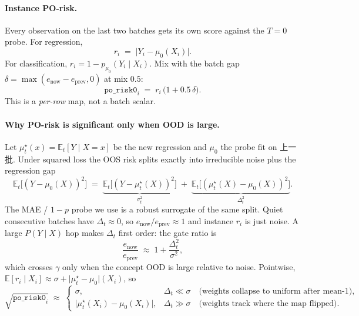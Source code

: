 \paragraph{Instance PO-risk.}
Every observation on the last two batches gets its own score against
the $T=0$ probe. For regression,
\begin{equation}
  r_i \;=\; \bigl|Y_i - \mu_0(X_i)\bigr|.
\end{equation}
For classification, $r_i=1-p_{\mu_0}(Y_i\mid X_i)$. Mix with the batch
gap $\delta=\max(e_{\mathrm{now}}-e_{\mathrm{prev}},0)$ at mix $0.5$:
\begin{equation}
  \texttt{po\_risk0}_i
    \;=\; r_i\,\bigl(1 + 0.5\,\delta\bigr).
\end{equation}
This is a \emph{per-row} map, not a batch scalar.

\paragraph{Why PO-risk is significant only when OOD is large.}
Let $\mu_t^\star(x)=\mathbb{E}_t[Y\mid X=x]$ be the new regression and
$\mu_0$ the probe fit on 上一批. Under squared loss the OOS risk
splits exactly into irreducible noise plus the regression gap
\begin{equation}
  \mathbb{E}_t\bigl[(Y-\mu_0(X))^2\bigr]
    \;=\;
    \underbrace{\mathbb{E}_t\bigl[(Y-\mu_t^\star(X))^2\bigr]}_{\sigma_t^2}
    \;+\;
    \underbrace{\mathbb{E}_t\bigl[(\mu_t^\star(X)-\mu_0(X))^2\bigr]}_{\Delta_t^2}.
  \label{eq:po-excess}
\end{equation}
The MAE / $1-p$ probe we use is a robust surrogate of the same split.
Quiet consecutive batches have $\Delta_t\approx 0$, so
$e_{\mathrm{now}}/e_{\mathrm{prev}}\approx 1$ and instance
$r_i$ is just noise. A large $P(Y\mid X)$ hop makes $\Delta_t$ first
order: the gate ratio is
\begin{equation}
  \frac{e_{\mathrm{now}}}{e_{\mathrm{prev}}}
    \;\approx\;
    1 + \frac{\Delta_t^2}{\sigma^2},
\end{equation}
which crosses $\gamma$ only when the concept OOD is large relative to
noise. Pointwise, $\mathbb{E}[r_i\mid X_i]\approx \sigma+\lvert\mu_t^\star-\mu_0\rvert(X_i)$,
so
\begin{equation}
  \sqrt{\texttt{po\_risk0}_i}
    \;\approx\;
    \begin{cases}
      \sigma, & \Delta_t \ll \sigma \quad\text{(weights collapse to uniform after mean-1)},\\[2pt]
      \bigl|\mu_t^\star(X_i)-\mu_0(X_i)\bigr|, & \Delta_t \gg \sigma \quad\text{(weights track where the map flipped)}.
    \end{cases}
\end{equation}
